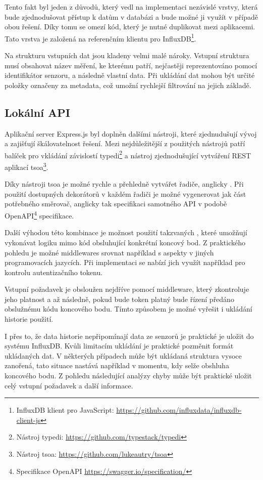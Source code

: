 Tento fakt byl jeden z důvodů, který vedl na implementaci nezávislé vrstvy, která bude zjednodušovat přístup k datům v databázi a bude možné ji využít v případě obou řešení. Díky tomu se omezí kód, který je nutné duplikovat mezi aplikacemi. Tato vrstva je založená na referenčním klientu pro InfluxDB\footnote{InfluxDB klient pro JavaScript: \url{https://github.com/influxdata/influxdb-client-js}}.

Na strukturu vstupních dat jsou kladeny velmi malé nároky. Vstupní struktura musí obsahovat název měření, ke kterému patří, nejčastěji reprezentováno pomocí identifikátor senzoru, a následně vlastní data. Při ukládání dat mohou být určité položky označeny za metadata, což umožní rychlejší filtrování na jejich základě.

\subsection{Lokální API}
Aplikační server Express.js byl doplněn dalšími nástroji, které zjednudušují vývoj a zajišťují škálovatelnost řešení. Mezi nejdůležitější z použitých nástrojů patří balíček pro vkládání závislostí typedi\footnote{Nástroj typedi: \url{https://github.com/typestack/typedi}} a nástroj zjednodušující vytváření REST aplikací tsoa\footnote{Nástroj tsoa: \url{https://github.com/lukeautry/tsoa}}.

Díky nástroji tsoa je možné rychle a přehledně vytvářet řadiče, anglicky . Při použití dostupných dekorátorů v každém řadiči je možné vygenerovat jak část potřebného směrovač, anglicky  tak specifikaci samotného API v podobě OpenAPI\footnote{Specifikace OpenAPI \url{https://swagger.io/specification/}} specifikace. 

Další výhodou této kombinace je možnost použití takzvaných , které umožňují vykonávat logiku mimo kód obsluhující konkrétní koncový bod. Z praktického pohledu je možné middlewares srovnat například s aspekty v jiných programovacích jazycích. Při implementaci se nabízí jich využít například pro kontrolu autentizačního tokenu. 

Vstupní požadavek je obsloužen nejdříve pomocí middleware, který zkontroluje jeho platnost a až následně, pokud bude token platný bude řízení předáno obslužnému kódu koncového bodu. Tímto způsobem je možné vyřešit i ukládání historie použití.

I přes to, že data historie nepřipomínají data ze senzorů je praktické je uložit do systému InfluxDB. Kvůli limitacím ukládání je praktické pozměnit formát ukládaných dat. V některých případech může být ukládaná struktura vysoce zanořená, tato situace nastává například v momentu, kdy selže obshluha koncového bodu. Z pohledu následující analýzy chyby může být praktické uložit celý vstupní požadavek a další informace.


